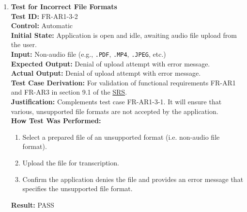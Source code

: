 \documentclass[12pt, titlepage]{article}
\begin{document}
\begin{enumerate}
  \item \textbf{Test for Incorrect File Formats} \\
    \newline
    \textbf{Test ID:} FR-AR1-3-2 \\
    \textbf{Control:} Automatic \\
    \textbf{Initial State:} Application is open and idle, awaiting audio file upload from the user. \\
    \textbf{Input:} Non-audio file (e.g., \texttt{.PDF}, \texttt{.MP4}, \texttt{.JPEG}, etc.) \\
    \textbf{Expected Output:} Denial of upload attempt with error message. \\
    \textbf{Actual Output:} Denial of upload attempt with error message.\\
    \textbf{Test Case Derivation:} For validation of functional requirements FR-AR1 and FR-AR3 in section 9.1 of the
    \href{https://github.com/emilyperica/ScoreGen/blob/main/docs/SRS-Volere/SRS.pdf}{SRS}. \\
    \textbf{Justification:} Complements test case FR-AR1-3-1. It will ensure that various, unsupported file formats are 
    not accepted by the application. \\
    \textbf{How Test Was Performed:}
    \begin{enumerate}
        \item Select a prepared file of an unsupported format (i.e. non-audio file format).
        \item Upload the file for transcription.
        \item Confirm the application denies the file and provides an error message that specifies the unsupported file format.
    \end{enumerate}
    \textbf{Result:} PASS
  

\end{enumerate}
\end{document}
